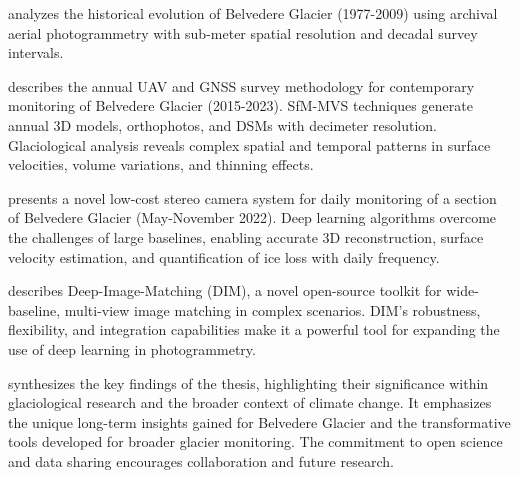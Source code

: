 \textbf{} analyzes the historical evolution of Belvedere Glacier (1977-2009) using archival aerial photogrammetry with sub-meter spatial resolution and decadal survey intervals.

\textbf{} describes the annual UAV and GNSS survey methodology for contemporary monitoring of Belvedere Glacier (2015-2023).  
SfM-MVS techniques generate annual 3D models, orthophotos, and DSMs with decimeter resolution.
Glaciological analysis reveals complex spatial and temporal patterns in surface velocities, volume variations, and thinning effects.

\textbf{} presents a novel low-cost stereo camera system for daily monitoring of a section of Belvedere Glacier (May-November 2022).
Deep learning algorithms overcome the challenges of large baselines, enabling accurate 3D reconstruction, surface velocity estimation, and quantification of ice loss with daily frequency. 

\textbf{} describes Deep-Image-Matching (DIM), a novel open-source toolkit for wide-baseline, multi-view image matching in complex scenarios. 
DIM's robustness, flexibility, and integration capabilities make it a powerful tool for expanding the use of deep learning in photogrammetry. 

\textbf{} synthesizes the key findings of the thesis, highlighting their significance within glaciological research and the broader context of climate change.  
It emphasizes the unique long-term insights gained for Belvedere Glacier and the transformative tools developed for broader glacier monitoring. 
The commitment to open science and data sharing encourages collaboration and future research.

\makechapterbibliography{}